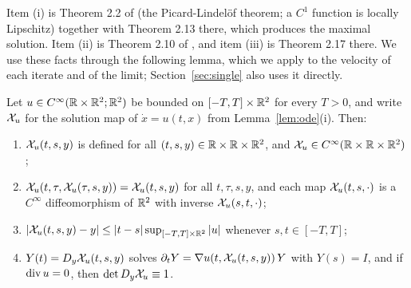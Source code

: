 Item (i) is Theorem 2.2 of \cite{Teschl} (the Picard-Lindel\"of theorem; a
$C^1$ function is locally Lipschitz) together with Theorem 2.13 there, which
produces the maximal solution. Item (ii) is Theorem 2.10 of \cite{Teschl}, and
item (iii) is Theorem 2.17 there. We use these facts through the following
lemma, which we apply to the velocity of each iterate and of the limit;
Section~\ref{sec:single} also uses it directly.

\begin{lemma}
\label{lem:flow}
Let $u\in C^\infty(\mathbb{R}\times\mathbb{R}^2;\mathbb{R}^2)$ be bounded on $[-T,T]\times\mathbb{R}^2$ for every
$T>0$, and write $\mathcal{X}_u$ for the solution map of $\dot x=u(t,x)$ from
Lemma~\ref{lem:ode}(i). Then:
\begin{enumerate}[label=\textup{(\alph*)}]
\item $\mathcal{X}_u(t,s,y)$ is defined for all $(t,s,y)\in\mathbb{R}\times\mathbb{R}\times\mathbb{R}^2$, and
  $\mathcal{X}_u\in C^\infty(\mathbb{R}\times\mathbb{R}\times\mathbb{R}^2)$;
\item $\mathcal{X}_u(t,\tau,\mathcal{X}_u(\tau,s,y))=\mathcal{X}_u(t,s,y)$ for all $t,\tau,s,y$, and
  each map $\mathcal{X}_u(t,s,\cdot)$ is a $C^\infty$ diffeomorphism of $\mathbb{R}^2$ with
  inverse $\mathcal{X}_u(s,t,\cdot)$;
\item $|\mathcal{X}_u(t,s,y)-y|\le|t-s|\sup_{[-T,T]\times\mathbb{R}^2}|u|$ whenever
  $s,t\in[-T,T]$;
\item $Y(t)=D_y\mathcal{X}_u(t,s,y)$ solves $\partial_tY=\nabla u(t,\mathcal{X}_u(t,s,y))\,Y$
  with $Y(s)=I$, and if $\operatorname{div} u=0$, then $\det D_y\mathcal{X}_u\equiv1$.
\end{enumerate}
\end{lemma}

